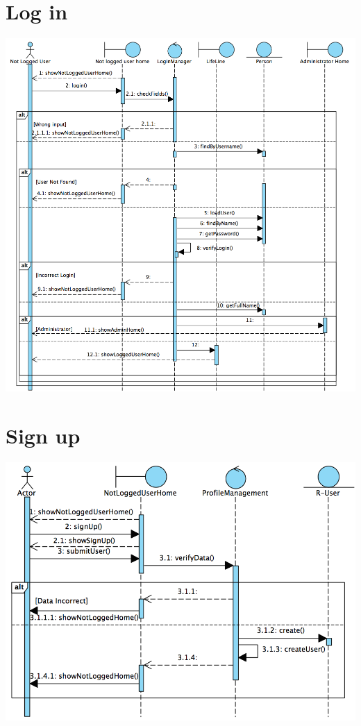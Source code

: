 \documentclass[12pt]{book}
\begin{document}
\section{Log in}
\vspace{2cm}
\includegraphics[scale=0.5]{Login_SD}
\newpage
\section{Sign up}
\vspace{2cm}
\includegraphics[scale=0.5]{signup_SD}
\newpage
\end{document}
